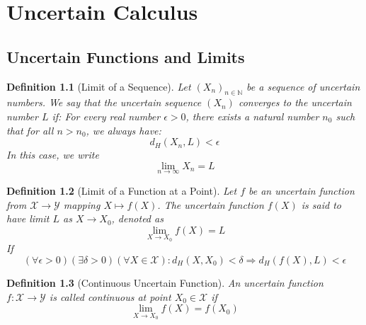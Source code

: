 \documentclass[a4paper,12pt, twoside]{memoir}
\newtheorem{definition}{Definition}[chapter]
\begin{document}
\chapter{Uncertain Calculus}

\section{Uncertain Functions and Limits}

\begin{definition}[Limit of a Sequence]
	Let $(X_n)_{n \in \mathbb{N}}$ be a sequence of uncertain numbers.
	We say that the uncertain sequence $(X_n)$ converges to the uncertain number $L$ if:
	For every real number $\epsilon > 0$, there exists a natural number $n_0$ such that for all $n > n_0$, we always have:
	$$d_H(X_n, L) < \epsilon$$
	In this case, we write \[\lim_{n \to \infty} X_n = L\]
\end{definition}

\begin{definition}[Limit of a Function at a Point]
	Let $f$ be an uncertain function from $\mathcal{X} \rightarrow \mathcal{Y}$ mapping $X \mapsto f(X)$. The uncertain function $f(X)$ is said to have limit $L$ as $X \rightarrow X_0$, denoted as
	$$\lim\limits_{X \rightarrow X_0}f(X) = L$$
	If $$(\forall \epsilon >0)(\exists \delta >0)(\forall X \in \mathcal{X}) : d_H(X,X_0)<\delta \Rightarrow d_H(f(X),L) < \epsilon$$
\end{definition}

\begin{definition}[Continuous Uncertain Function]
	An uncertain function $f : \mathcal{X} \to \mathcal{Y}$ is called continuous at point $X_0 \in \mathcal{X}$ if
	$$\lim\limits_{X \rightarrow X_0}f(X) = f(X_0)$$
\end{definition}
\end{document}
